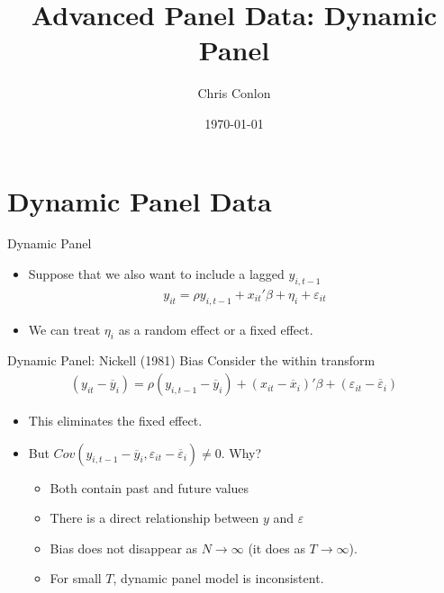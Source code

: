 \documentclass[xcolor=pdftex,dvipsnames,table,mathserif,aspectratio=169]{beamer}
\title{Advanced Panel Data: Dynamic Panel}
\author{Chris Conlon }
\institute{NYU Stern }
\date{\today}
\begin{document}
\maketitle




\section*{Dynamic Panel Data}

\begin{frame}{Dynamic Panel}
\begin{itemize}
\item Suppose that we also want to include a lagged $y_{i,t-1}$
\begin{eqnarray*}
y_{it} = \rho y_{i,t-1} + x_{it}'\beta + \eta_i + \varepsilon_{it}
\end{eqnarray*}
\item We can treat $\eta_i$ as a \alert{random effect} or a \alert{fixed effect}.
\end{itemize}
\end{frame}

\begin{frame}{Dynamic Panel: Nickell (1981) Bias}
Consider the within transform
\begin{eqnarray*}
(y_{it}-\overline{y}_i) = \rho (y_{i,t-1}-\overline{y}_i) + (x_{it}-\overline{x}_i)'\beta +( \varepsilon_{it}- \overline{\varepsilon}_{i})
\end{eqnarray*}
\begin{itemize}
\item This eliminates the fixed effect.
\item But $Cov(y_{i,t-1}-\overline{y}_i, \varepsilon_{it}- \overline{\varepsilon}_{i}) \neq0$. Why?
\begin{itemize}
\item Both contain past and future values
\item There is a direct relationship between $y$ and $\varepsilon$
\item Bias does not disappear as $N \rightarrow \infty$ (it does as $T\rightarrow \infty$).
\item For small $T$, dynamic panel model is \alert{inconsistent}.
\end{itemize}
\end{itemize}
\end{frame}
\end{document}
